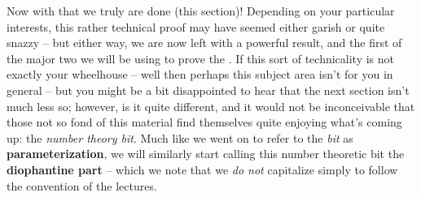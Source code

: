   Now with that we truly are done (this section)! Depending on your particular interests, this rather technical proof may have seemed either garish or quite snazzy -- but either way, we are now left with a powerful result, and the first of the major two we will be using to prove the \pwt. If this sort of technicality is not exactly your wheelhouse -- well then perhaps this subject area isn't for you in general -- but you might be a bit disappointed to hear that the next section isn't much less so; however, is it quite different, and it would not be inconceivable that those not so fond of this material find themselves quite enjoying what's coming up: the \emph{number theory bit}.  Much like we went on to refer to the \emph{\om bit} as \textbf{parameterization}, we will  similarly start calling this number theoretic bit the \textbf{diophantine part} -- which we note that we \emph{do not} capitalize simply to follow the convention of the lectures.
